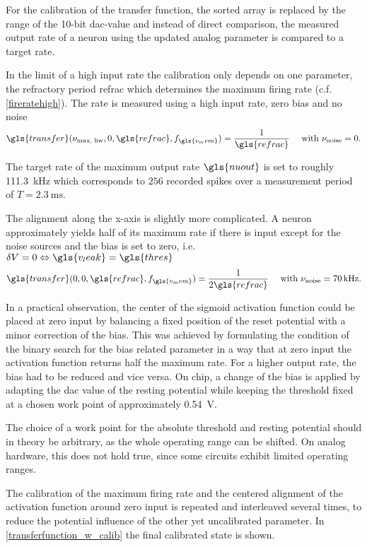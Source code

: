 For the calibration of the transfer function, the sorted array is replaced by the range of the 10-bit \gls{dac}-value and instead of direct comparison, the measured output rate of a neuron using the updated analog parameter is compared to a target rate.

In the limit of a high input rate the calibration only depends on one parameter, the refractory period \gls{refrac} which determines the maximum firing rate (c.f. \cref{fireratehigh}). The rate is measured using a high input rate, zero bias and no noise
\begin{equation}
\gls{transfer}(\nu_\text{max, hw}, 0, \gls{refrac}, f_{\gls{v_mem}}) = \frac{1}{\gls{refrac}} \quad \text{ with } \nu_\text{noise} = 0.
\end{equation}

The target rate of the maximum output rate $\gls{nuout}$ is set to roughly \SI{111.3}{\kilo \Hz} which corresponds to $256$ recorded spikes over a measurement period of $T=\SI{2.3}{\milli \s}$.

The alignment along the x-axis is slightly more complicated. A neuron approximately yields half of its maximum rate if there is input except for the noise sources and the bias is set to zero, i.e. $\delta V = 0 \Leftrightarrow \gls{v_leak} = \gls{thres}$
\begin{equation}
\gls{transfer}(0, 0, \gls{refrac}, f_{\gls{v_mem}}) = \frac{1}{2\gls{refrac}} \quad \text{ with } \nu_\text{noise} = \SI{70}{kHz}.
\end{equation}

In a practical observation, the center of the sigmoid activation function could be placed at zero input by balancing a fixed position of the reset potential with a minor correction of the bias. This was achieved by formulating the condition of the binary search for the bias related parameter in a way that at zero input the activation function returns half the maximum rate. For a higher output rate, the bias had to be reduced and vice versa. On chip, a change of the bias is applied by adapting the \gls{dac} value of the resting potential while keeping the threshold fixed at a chosen work point of approximately \SI{0.54}{\V}.

The choice of a work point for the absolute threshold and resting potential should in theory be arbitrary, as the whole operating range can be shifted. On analog hardware, this does not hold true, since some circuits exhibit limited operating ranges.

The calibration of the maximum firing rate and the centered alignment of the activation function around zero input is repeated and interleaved several times, to reduce the potential influence of the other yet uncalibrated parameter. In \cref{transferfunction_w_calib} the final calibrated state is shown. 



